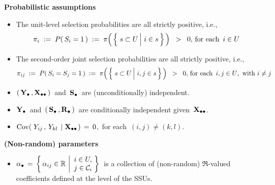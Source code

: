 \vskip 0.2cm
\noindent
\textbf{Probabilistic assumptions}
\begin{itemize}
\item
    The unit-level selection probabilities are all strictly positive, i.e.,
    \begin{equation*}
    \pi_{i}
    \; := \;
        P(\,S_{i} = 1\,)
    \; := \;
        \pi\!\left(\,\left\{\,
            \left.
            s \overset{{\color{white}.}}{\subset} U
            \,\right\vert\,
            i \in s
            \,\right\}
        \,\right)
    \;\; > \;\;
        0,\,
    \textnormal{for each \,$i \in U$\,
    }
    \end{equation*}
\item
    The second-order joint selection probabilities are all strictly positive, i.e.,
    \begin{equation*}
    \pi_{ij}
    \; := \;
        P(\,S_{i} = S_{j} = 1\,)
    \; := \;
        \pi\!\left(\,\left\{\,
            \left.
            s \overset{{\color{white}.}}{\subset} U
            \,\right\vert\,
            i, j \in s
            \,\right\}
        \,\right)
    \;\; > \;\;
        0,\,
    \textnormal{for each \,$i,j \in U$,\, with $i \neq j$}
    \end{equation*}
\item
    $\left(\,\mathbf{Y}_{\bullet}\,,\mathbf{X}_{\bullet\bullet}\,\right)$\, and \,$\mathbf{S}_{\bullet}$\, are (unconditionally) independent.
\item
    $\mathbf{Y}_{\bullet}$\, and \,$(\,\mathbf{S}_{\bullet}\,,\mathbf{R}_{\bullet}\,)$\, are {\color{red}conditionally independent} given \,$\mathbf{X}_{\bullet\bullet}$.
\item
    $\textnormal{Cov}\!\left(\;Y_{ij}\,,\,Y_{kl}\;\left\vert\;\mathbf{X}_{\bullet\bullet}\right.\right) \,=\, 0$,\,
    for each \,$(i,j) \neq (k,l)$.
\end{itemize}

\vskip 0.2cm
\noindent
\textbf{(Non-random) parameters}
\begin{itemize}
\item
    $
    \alpha_{\bullet}
    \, = \,
        \left\{\,
            \alpha_{ij} \in \mathbb{R}
            \,\left\vert
            \begin{array}{c} i \in U, \\ j \in \mathcal{C}_{i} \end{array}
            \right.
            \!\!\right\}
    $\,
    is a collection of (non-random)
    $\Re$-valued coefficients defined at the level of the SSUs.
\end{itemize}

